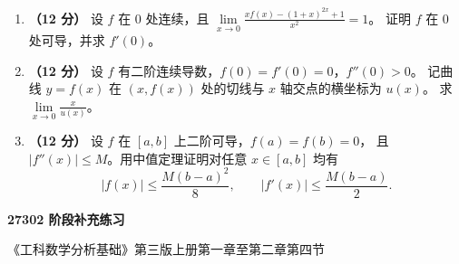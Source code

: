 \documentclass[UTF8,a4paper,zihao=-4,fontset=fandol]{ctexart}
\renewcommand{\lim}{\operatorname*{lim}\limits}
\begin{document}
\begin{enumerate}[start=20]
\item \textbf{（12 分）} 设 $f$ 在 $0$ 处连续，且
$\displaystyle\lim_{x\to0}\frac{xf(x)-(1+x)^{2x}+1}{x^2}=1$。
证明 $f$ 在 $0$ 处可导，并求 $f'(0)$。
\vspace{5.5cm}
\item \textbf{（12 分）} 设 $f$ 有二阶连续导数，$f(0)=f'(0)=0$，$f''(0)>0$。
记曲线 $y=f(x)$ 在 $(x,f(x))$ 处的切线与 $x$ 轴交点的横坐标为 $u(x)$。
求 $\displaystyle\lim_{x\to0}\frac{x}{u(x)}$。
\vspace{5.5cm}
\item \textbf{（12 分）} 设 $f$ 在 $[a,b]$ 上二阶可导，$f(a)=f(b)=0$，
且 $|f''(x)|\le M$。用中值定理证明对任意 $x\in[a,b]$ 均有
\[
  |f(x)|\le\frac{M(b-a)^2}{8},\qquad |f'(x)|\le\frac{M(b-a)}2 .
\]
\end{enumerate}

\newpage
{}
\begin{center}
  {\LARGE\bfseries 27302 阶段补充练习\par}
  \small 《工科数学分析基础》第三版上册第一章至第二章第四节
\end{center}
\end{document}

